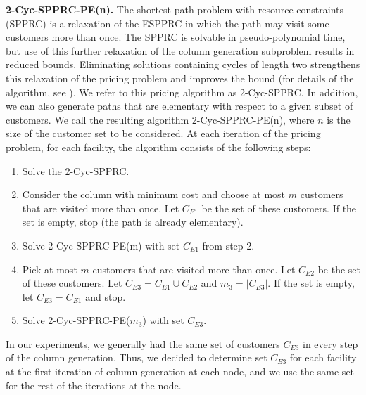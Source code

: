 {\bf 2-Cyc-SPPRC-PE(n).} The shortest path problem with resource
constraints (SPPRC) is a relaxation of the ESPPRC in which the path
may visit some customers more than once.
The SPPRC is solvable in pseudo-polynomial time, but use of this
further relaxation of the column generation subproblem results in
reduced bounds. Eliminating solutions containing cycles of length two
strengthens this relaxation of the pricing problem and improves the
bound (for details of the algorithm, see
\citet{IrnichDesaulniers2005}). We refer to this
pricing algorithm as 2-Cyc-SPPRC. In addition, we can also generate
paths that are elementary with respect to a given subset of customers.
We call the resulting algorithm 2-Cyc-SPPRC-PE(n), where $n$ is the
size of the customer set to be considered.
At each iteration of the pricing problem, for each
facility, the algorithm consists of the following steps:
\begin{enumerate}
\item Solve the 2-Cyc-SPPRC.  
\item Consider the column with minimum cost and choose at most $m$
customers that are visited more than once. Let $C_{E1}$ be the set of
these customers. If the set is empty, stop (the path is already
elementary).
\item Solve 2-Cyc-SPPRC-PE(m) with set $C_{E1}$ from step 2. 
\item Pick at most $m$ customers that are visited more than once. Let $C_{E2}$
be the set of these customers. Let $C_{E3} = C_{E1}\cup C_{E2}$ and $m_3 =
|C_{E3}|$. If the set is empty, let $C_{E3} = C_{E1}$ and stop.
\item Solve  2-Cyc-SPPRC-PE($m_3$) with set $C_{E3}$.
\end{enumerate} 
In our experiments, we generally had the same set of customers
$C_{E3}$ in every step of the column generation. Thus, we decided to
determine set $C_{E3}$ for each facility at the first iteration of
column generation at each node, and we use the same set for the rest
of the iterations at the node.
  
